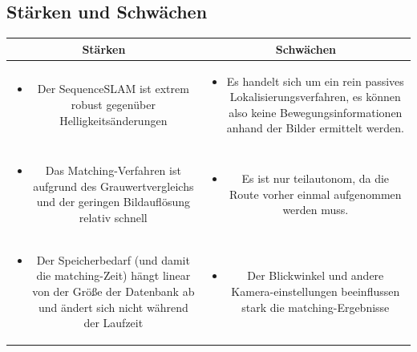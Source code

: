 \documentclass[12pt,a4paper,titlepage]{scrartcl}
\begin{document}
\subsection{Stärken und Schwächen}
\begin{table}[!htp]
\selectfont
\renewcommand{\tabularxcolumn}[1]{m{#1}} 
\label{tab:SeqSLAM_Pro_Con}
\centering
	\begin{tabularx}{1.0\textwidth}[t]{CC}
	\textbf{Stärken}	&	\textbf{Schwächen}\tabularnewline
	\hline
	\begin{itemize}
	\item Der SequenceSLAM ist extrem robust gegenüber Helligkeitsänderungen\newline \newline
	\end{itemize}
	&
	\begin{itemize}
	\item Es handelt sich um ein rein passives Lokalisierungsverfahren, es können also keine Bewegungsinformationen anhand der Bilder ermittelt werden.
	\end{itemize}
	\tabularnewline
	\hline
	\begin{itemize}
	\item Das Matching-Verfahren ist aufgrund des Grauwertvergleichs und der geringen Bildauflösung relativ schnell
	\end{itemize}	
	&
	\begin{itemize}
	\item Es ist nur teilautonom, da die Route vorher einmal aufgenommen werden muss.\newline
	\end{itemize}	
	\tabularnewline
	\hline
	\begin{itemize}
	\item Der Speicherbedarf (und damit die matching-Zeit) hängt linear von der Größe der Datenbank ab und ändert sich nicht während der Laufzeit
	\end{itemize}
	&
	\begin{itemize}
	\item Der Blickwinkel und andere Kamera-einstellungen beeinflussen stark die matching-Ergebnisse\newline \newline
	\end{itemize}
	\tabularnewline
	\bottomrule
	\end{tabularx}
\end{table}	
\end{document}
